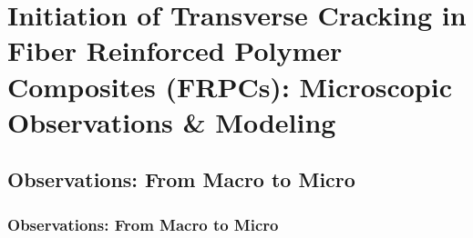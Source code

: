\documentclass[first,firstsupp,lastsupp,last,hyperref,table]{ETHclass}
\begin{document}
\section[Transverse Cracking in FRPCs]{Initiation of Transverse Cracking in Fiber Reinforced Polymer Composites (FRPCs): Microscopic Observations \& Modeling}

\subsection{Observations: From Macro to Micro}

\begin{frame}
\frametitle{\vspace{0.3cm}\small Observations: From Macro to Micro}
\vspace{-0.5cm}
\centering
\captionsetup[subfigure]{labelfont=footnotesize}
\begin{tikzpicture}



\end{tikzpicture}
\end{frame}
\end{document}
